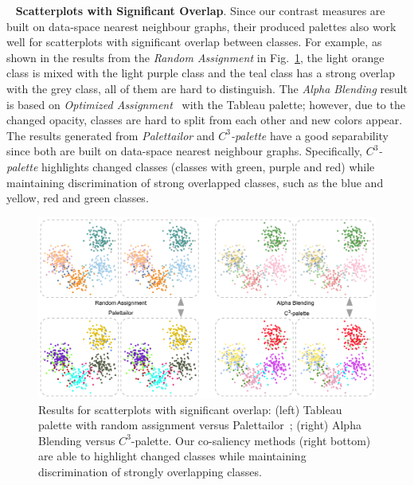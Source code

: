 \documentclass[review,onecolumn]{vgtc}                %
\newcommand{\myparagraph}[1]{\mbox{\ } \newline \noindent \textbf{#1}}
\renewcommand{\paragraph}[1]{\myparagraph{#1}}
\begin{document}
\paragraph{Scatterplots with Significant Overlap}.
Since our contrast measures are built on data-space nearest neighbour graphs, their produced palettes also work well for scatterplots with significant overlap between classes. For example, as shown in the results from the \emph{Random Assignment} in Fig.~\ref{fig:scatterOverlap}, the light orange class is mixed with the light purple class and the teal class has a strong overlap with the grey class, all of them are hard to distinguish. The \emph{Alpha Blending} result is based on \emph{Optimized Assignment}~\cite{Wang2018} with the Tableau palette; however, due to the changed opacity, classes are hard to split from each other and new colors appear. The results generated from \emph{Palettailor} and \emph{$C^3$-palette} have a good separability since both are built on data-space nearest neighbour graphs. Specifically, \emph{$C^3$-palette} highlights  changed classes (classes with green, purple and red) while maintaining discrimination of strong overlapped classes, such as the blue and yellow, red and green classes.

\begin{figure}[h]
\centering
\includegraphics[width=1\linewidth]{scatter-overlap.pdf}
\caption{Results for scatterplots with significant overlap: (left) Tableau palette with random assignment versus Palettailor~\cite{Lu21}; (right) Alpha Blending versus $C^3$-palette. Our co-saliency methods (right bottom) are able to highlight changed classes while maintaining discrimination of strongly overlapping classes.}
\vspace*{-3mm}
\label{fig:scatterOverlap}
\end{figure}

\end{document}
